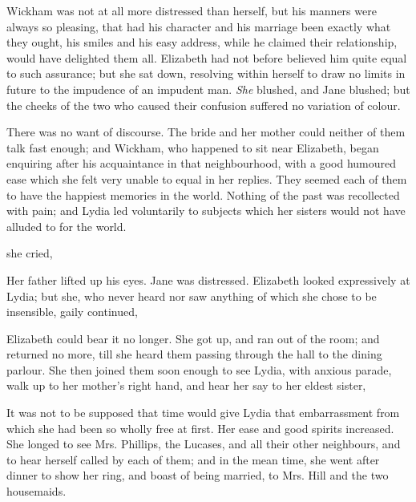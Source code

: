 Wickham was not at all more distressed than herself, but his manners were always so pleasing, that had his character and his marriage been exactly what they ought, his smiles and his easy address, while he claimed their relationship, would have delighted them all. Elizabeth had not before believed him quite equal to such assurance; but she sat down, resolving within herself to draw no limits in future to the impudence of an impudent man. {\em She} blushed, and Jane blushed; but the cheeks of the two who caused their confusion suffered no variation of colour.

There was no want of discourse. The bride and her mother could neither of them talk fast enough; and Wickham, who happened to sit near Elizabeth, began enquiring after his acquaintance in that neighbourhood, with a good humoured ease which she felt very unable to equal in her replies. They seemed each of them to have the happiest memories in the world. Nothing of the past was recollected with pain; and Lydia led voluntarily to subjects which her sisters would not have alluded to for the world.

 she cried, 

Her father lifted up his eyes. Jane was distressed. Elizabeth looked expressively at Lydia; but she, who never heard nor saw anything of which she chose to be insensible, gaily continued, 

Elizabeth could bear it no longer. She got up, and ran out of the room; and returned no more, till she heard them passing through the hall to the dining parlour. She then joined them soon enough to see Lydia, with anxious parade, walk up to her mother's right hand, and hear her say to her eldest sister, 

It was not to be supposed that time would give Lydia that embarrassment from which she had been so wholly free at first. Her ease and good spirits increased. She longed to see Mrs. Phillips, the Lucases, and all their other neighbours, and to hear herself called  by each of them; and in the mean time, she went after dinner to show her ring, and boast of being married, to Mrs. Hill and the two housemaids.

